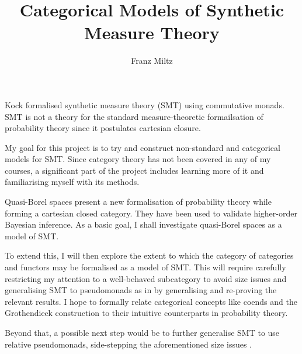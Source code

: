\documentclass{article}
\begin{document}
\title{Categorical Models of Synthetic Measure Theory}
\author{Franz Miltz}
\maketitle

Kock formalised synthetic measure theory (SMT) using commutative monads. \cite{kock2011commutative}
SMT is not a theory for the standard measure-theoretic formailsation of probability theory since it
postulates cartesian closure.

My goal for this project is to try and construct non-standard and categorical models for SMT.
Since category theory has not been covered in any of my courses, a significant part of the project
includes learning more of it and familiarising myself with its methods.

Quasi-Borel spaces present a new formalisation of probability theory while forming a cartesian
closed category. \cite{DBLP:journals/corr/HeunenKSY17}
They have been used to validate higher-order Bayesian inference. \cite{DBLP:journals/corr/abs-1711-03219}
As a basic goal, I shall investigate quasi-Borel spaces as a model of SMT.

To extend this, I will then explore the extent to which the category of categories and functors may
be formalised as a model of SMT.
This will require carefully restricting my attention to a well-behaved subcategory to avoid size
issues and generalising SMT to pseudomonads as in \cite{Marmolejo_no-iterationpseudomonads} by
generalising and re-proving the relevant results.
I hope to formally relate categorical concepts like coends and the Grothendieck construction to
their intuitive counterparts in probability theory.

Beyond that, a possible next step would be to further generalise SMT to use relative pseudomonads,
side-stepping the aforementioned size issues \cite{Fiore_relative-pseudomonads2017}.

{}

\end{document}
